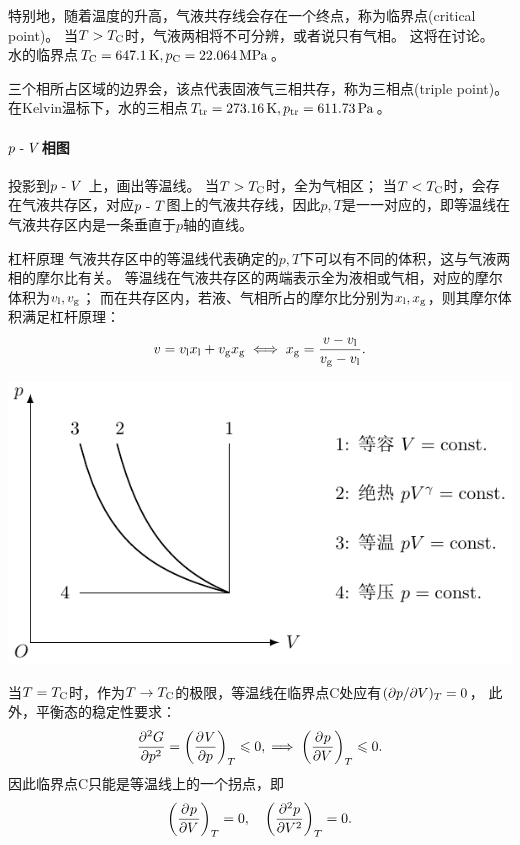 特别地，随着温度的升高，气液共存线会存在一个终点，称为临界点(critical point)。
当$T>T_\crt$时，气液两相将不可分辨，或者说只有气相。
这将在讨论。
水的临界点$T_\crt=\SI{647.1}{K},p_\crt=\SI{22.064}{MPa}$。

三个相所占区域的边界会，该点代表固液气三相共存，称为三相点(triple point)。
在Kelvin温标下，水的三相点$T\tri=\SI{273.16}{K},p\tri=\SI{611.73}{Pa}$。

\paragraph{$p\vs V$相图}

投影到$p\vs V$ 上，画出等温线。
当$T>T_\crt$时，全为气相区；
当$T<T_\crt$时，会存在气液共存区，对应$p\vs T$图上的气液共存线，因此$p,T$是一一对应的，即等温线在气液共存区内是一条垂直于$p$轴的直线。

\begin{example}
	{杠杆原理}{}
	气液共存区中的等温线代表确定的$p,T$下可以有不同的体积，这与气液两相的摩尔比有关。
	等温线在气液共存区的两端表示全为液相或气相，对应的摩尔体积为$v_\phl,v_\phg$；
	而在共存区内，若液、气相所占的摩尔比分别为$x_\phl,x_\phg$，则其摩尔体积满足杠杆原理：
	\[
		v=v_\phl x_\phl+v_\phg x_\phg\iff x_\phg=\frac{v-v_\phl}{v_\phg-v_\phl}.
	\]
\end{example}

\begin{center}
	\includegraphics[page=11]{figures/tikz/coordinates.pdf}
	\label{fig:H2O phase P-V}
\end{center}

当$T=T_\crt$时，作为$T\to T_\crt$的极限，等温线在临界点C处应有$(\p p/\p V)_T=0$，
此外，平衡态的稳定性要求：
\[
	\pv[2]Gp=\pu[T]Vp\leq 0,\implies\pu[T]pV\leq 0.
\]
因此临界点C只能是等温线上的一个拐点，即
\begin{equation}
	\label{eq:critical point}
	\pu[T]pV=0,\quad\biggkh{\pv[2]pV}_T=0.
\end{equation}

